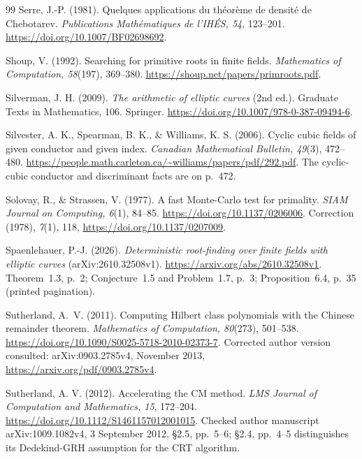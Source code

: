 \documentclass[11pt]{article}
\theoremstyle{definition}
\theoremstyle{remark}
\begin{document}
\begin{thebibliography}{99}
Serre, J.-P. (1981).
Quelques applications du th\'eor\`eme de densit\'e de Chebotarev.
\emph{Publications Math\'ematiques de l'IH\'ES, 54}, 123--201.
\url{https://doi.org/10.1007/BF02698692}.

Shoup, V. (1992). Searching for primitive roots in finite fields.
\emph{Mathematics of Computation, 58}(197), 369--380.
\url{https://shoup.net/papers/primroots.pdf}.

Silverman, J. H. (2009).
\emph{The arithmetic of elliptic curves} (2nd ed.).
Graduate Texts in Mathematics, 106. Springer.
\url{https://doi.org/10.1007/978-0-387-09494-6}.

Silvester, A. K., Spearman, B. K., \& Williams, K. S. (2006).
Cyclic cubic fields of given conductor and given index.
\emph{Canadian Mathematical Bulletin, 49}(3), 472--480.
\url{https://people.math.carleton.ca/~williams/papers/pdf/292.pdf}.
The cyclic-cubic conductor and discriminant facts are on p.~472.

Solovay, R., \& Strassen, V. (1977). A fast Monte-Carlo test for primality.
\emph{SIAM Journal on Computing, 6}(1), 84--85.
\url{https://doi.org/10.1137/0206006}.
Correction (1978), \emph{7}(1), 118,
\url{https://doi.org/10.1137/0207009}.

Spaenlehauer, P.-J. (2026).
\emph{Deterministic root-finding over finite fields with elliptic curves}
(arXiv:2610.32508v1).
\url{https://arxiv.org/abs/2610.32508v1}.
Theorem~1.3, p.~2; Conjecture~1.5 and Problem~1.7, p.~3;
Proposition~6.4, p.~35 (printed pagination).

Sutherland, A.~V. (2011).
Computing Hilbert class polynomials with the Chinese remainder theorem.
\emph{Mathematics of Computation, 80}(273), 501--538.
\url{https://doi.org/10.1090/S0025-5718-2010-02373-7}.
Corrected author version consulted: arXiv:0903.2785v4, November 2013,
\url{https://arxiv.org/pdf/0903.2785v4}.

Sutherland, A. V. (2012).
Accelerating the CM method.
\emph{LMS Journal of Computation and Mathematics, 15}, 172--204.
\url{https://doi.org/10.1112/S1461157012001015}.
Checked author manuscript arXiv:1009.1082v4, 3 September 2012,
\S2.5, pp.~5--6; \S2.4, pp.~4--5 distinguishes its Dedekind-GRH
assumption for the CRT algorithm.


\end{thebibliography}
\end{document}
